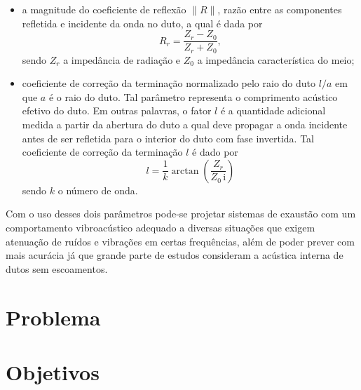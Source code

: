 \begin{itemize}
    \item a magnitude do coeficiente de reflexão $\|R\|$, razão entre as componentes refletida e incidente da onda no duto, a qual é dada por
    \begin{equation}
        R_{r} =\frac{Z_{r} - Z_{0}}{Z_{r} + Z_{0}},
        \label{eq:R}
    \end{equation}
    sendo $Z_{r}$ a impedância de radiação e $Z_{0}$ a impedância característica do meio;
    
    \item coeficiente de correção da terminação normalizado pelo raio do duto $l/a$ em que $a$ é o raio do duto. Tal parâmetro representa o comprimento acústico efetivo do duto. Em outras palavras, o fator $l$ é a quantidade adicional medida a partir da abertura do duto a qual deve propagar a onda incidente antes de ser refletida para o interior do duto com fase invertida. Tal coeficiente de correção da terminação $l$ é dado por
    \begin{equation}
        l = \frac{1}{k} \arctan\!\left(\frac{Z_{r}}{Z_{0} \, \mathrm{i}}\right)
        \label{eq:l}
    \end{equation}
    sendo $k$ o número de onda.
\end{itemize}

Com o uso desses dois parâmetros pode-se projetar sistemas de exaustão com um comportamento vibroacústico adequado a diversas situações que exigem atenuação de ruídos e vibrações em certas frequências, além de poder prever com mais acurácia já que grande parte de estudos consideram a acústica interna de dutos sem escoamentos.

\section{Problema}

\section{Objetivos}